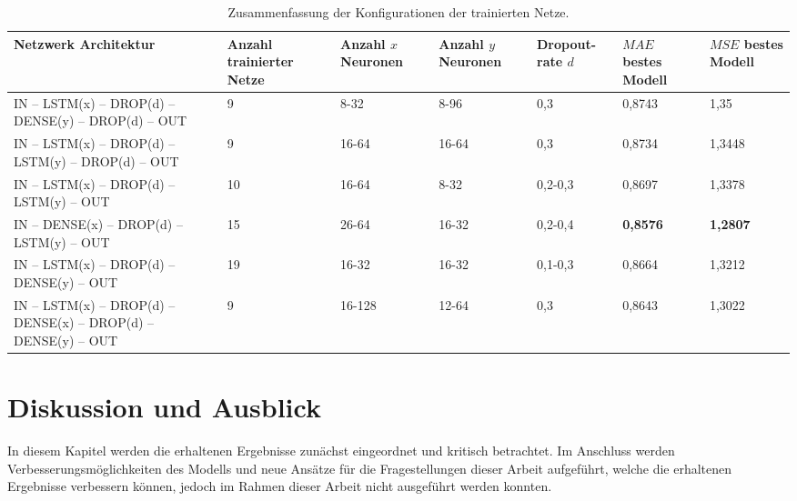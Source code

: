 \documentclass[
12pt, %
toc=listofnumbered, %
toc=chapterentrydotfill, %
numbers=noenddot, %
captions=tableheading, %
bibliography=numbered
]{scrreprt}
\begin{document}
\begin{table}[ht]
	\centering
	\caption{Zusammenfassung der Konfigurationen der trainierten Netze.}
	\begin{tabular}{|C{2.5cm}|C{1.8cm}|C{2cm}|C{2cm}|C{2cm}|C{1.8cm}|C{1.8cm}|}
	\hline
	\textbf{Netzwerk Architektur} & \textbf{Anzahl trainierter Netze} & \textbf{Anzahl $x$ Neuronen} & \textbf{Anzahl $y$ Neuronen} & \textbf{Dropout-rate $d$} & \textbf{$MAE$ bestes Modell} & \textbf{$MSE$ bestes Modell} \\
	\hline
	IN – LSTM(x) – DROP(d) – DENSE(y) – DROP(d) – OUT & 9 & 8-32 & 8-96 & 0,3 & 0,8743 & 1,35 \\
	\hline
	IN – LSTM(x) – DROP(d) – LSTM(y) – DROP(d) – OUT & 9 & 16-64 & 16-64 & 0,3 & 0,8734 & 1,3448 \\
	\hline
	IN – LSTM(x) – DROP(d) – LSTM(y) – OUT & 10 & 16-64 & 8-32 & 0,2-0,3 & 0,8697 & 1,3378 \\
	\hline
	IN – DENSE(x) – DROP(d) – LSTM(y) – OUT & 15 & 26-64 & 16-32 & 0,2-0,4 & \textbf{0,8576} & \textbf{1,2807} \\
	\hline
	IN – LSTM(x) – DROP(d) – DENSE(y) – OUT & 19 & 16-32 & 16-32 & 0,1-0,3 & 0,8664 & 1,3212 \\
	\hline
	IN – LSTM(x) – DROP(d) – DENSE(x) – DROP(d) – DENSE(y) – OUT & 9 & 16-128 & 12-64 & 0,3 & 0,8643 & 1,3022\\
	\hline
	\end{tabular}
	\label{tab:ergebnisse}
\end{table}


\chapter{Diskussion und Ausblick}

In diesem Kapitel werden die erhaltenen Ergebnisse zunächst eingeordnet und kritisch betrachtet.
Im Anschluss werden Verbesserungsmöglichkeiten des Modells und neue Ansätze für die Fragestellungen dieser Arbeit aufgeführt, welche die erhaltenen Ergebnisse verbessern können, jedoch im Rahmen dieser Arbeit nicht ausgeführt werden konnten.
\end{document}
